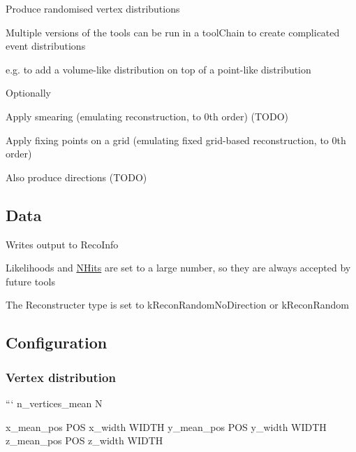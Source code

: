 Produce randomised vertex distributions

Multiple versions of the tools can be run in a tool\-Chain to create complicated event distributions
\begin{DoxyItemize}
\item e.\-g. to add a volume-\/like distribution on top of a point-\/like distribution
\end{DoxyItemize}

Optionally
\begin{DoxyItemize}
\item Apply smearing (emulating reconstruction, to 0th order) (T\-O\-D\-O)
\item Apply fixing points on a grid (emulating fixed grid-\/based reconstruction, to 0th order)
\item Also produce directions (T\-O\-D\-O)
\end{DoxyItemize}

\subsection*{Data}


\begin{DoxyItemize}
\item Writes output to {\ttfamily Reco\-Info}
\begin{DoxyItemize}
\item Likelihoods and \hyperlink{classNHits}{N\-Hits} are set to a large number, so they are always accepted by future tools
\item The Reconstructer type is set to {\ttfamily k\-Recon\-Random\-No\-Direction} or {\ttfamily k\-Recon\-Random}
\end{DoxyItemize}
\end{DoxyItemize}

\subsection*{Configuration}

\subsubsection*{Vertex distribution}

``` n\-\_\-vertices\-\_\-mean N

x\-\_\-mean\-\_\-pos P\-O\-S x\-\_\-width W\-I\-D\-T\-H y\-\_\-mean\-\_\-pos P\-O\-S y\-\_\-width W\-I\-D\-T\-H z\-\_\-mean\-\_\-pos P\-O\-S z\-\_\-width W\-I\-D\-T\-H

